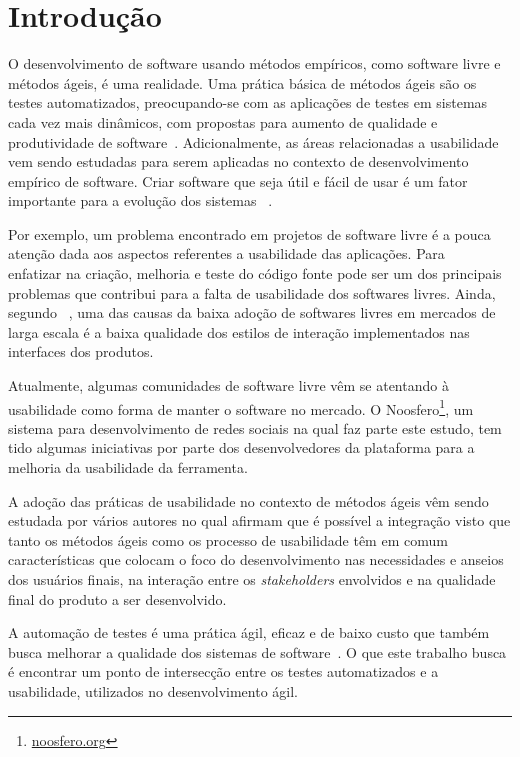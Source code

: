 \chapter{Introdução}

O desenvolvimento de software usando métodos empíricos, como software livre e métodos ágeis, é uma realidade. Uma prática básica de métodos ágeis são os testes automatizados, preocupando-se com as aplicações de testes em sistemas cada vez mais dinâmicos, com propostas para aumento de qualidade e produtividade de software~\cite{vicente2010}.
%
Adicionalmente, as áreas relacionadas a usabilidade vem sendo estudadas para serem aplicadas no contexto de desenvolvimento empírico de software. Criar software que seja útil e fácil de usar é um fator importante para a evolução dos sistemas ~\cite{santos2012}.

Por exemplo, um problema encontrado em projetos de software livre é a pouca atenção dada aos aspectos referentes a usabilidade das aplicações. Para ~ enfatizar na criação, melhoria e teste do código fonte pode ser um dos principais problemas que contribui para a falta de usabilidade dos softwares livres.
%
Ainda, segundo ~, uma das causas da baixa adoção de softwares livres em mercados de larga escala é a baixa qualidade dos estilos de interação implementados nas interfaces dos produtos. 

Atualmente, algumas comunidades de software livre vêm se atentando à usabilidade como forma de manter o software no mercado. 
%
O Noosfero\footnote{\url{noosfero.org}}, um sistema para desenvolvimento de redes sociais na qual faz parte este estudo, tem tido algumas iniciativas por parte dos desenvolvedores da plataforma para a melhoria da usabilidade da ferramenta. 

A adoção das práticas de usabilidade no contexto de métodos ágeis vêm sendo estudada por vários autores no qual afirmam que é possível a integração visto que tanto os métodos ágeis como os processo de usabilidade têm em comum características que colocam o foco do desenvolvimento nas necessidades e anseios dos usuários finais, na interação entre os \textit{stakeholders} envolvidos e na qualidade final do produto a ser desenvolvido.

A automação de testes é uma prática ágil, eficaz e de baixo custo que também busca melhorar a qualidade dos sistemas de software~\cite{cotter1995}. O que este trabalho busca é encontrar um ponto de intersecção entre os testes automatizados e a usabilidade, utilizados no desenvolvimento ágil.

